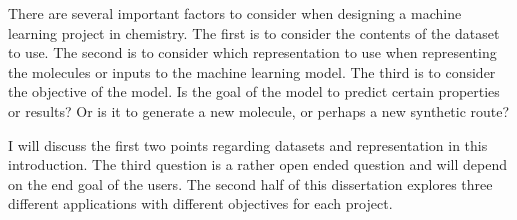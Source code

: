 There are several important factors to consider when designing a machine learning project in chemistry. The first is to consider the contents of the dataset to use. The second is to consider which representation to use when representing the molecules or inputs to the machine learning model. The third is to consider the objective of the model. Is the goal of the model to predict certain properties or results? Or is it to generate a new molecule, or perhaps a new synthetic route? 

I will discuss the first two points regarding datasets and representation in this introduction. The third question is a rather open ended question and will depend on the end goal of the users. The second half of this dissertation explores three different applications with different objectives for each project. 
